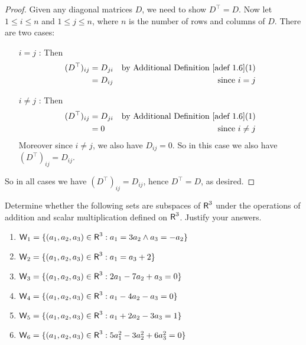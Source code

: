 \begin{proof}
Given any diagonal matrices \(D\), we need to show \(D^\top = D\).
Now let \(1 \le i \le n\) and \(1 \le j \le n\), where \(n\) is the number of rows and columns of \(D\).
There are two cases:
\begin{itemize}
    \item[\(i = j\)]: Then
        \begin{align*}
            (D^\top)_{ij} & = D_{ji} & \text{by \ADEF{1.6}(1)} \\
                       & = D_{ij} & \text{since \(i = j\)}
        \end{align*}
    \item[\(i \ne j\)]: Then
        \begin{align*}
            (D^\top)_{ij} & = D_{ji} & \text{by \ADEF{1.6}(1)} \\
                       & = 0 & \text{since \(i \ne j\)}
        \end{align*}
        Moreover since \(i \ne j\), we also have \(D_{ij} = 0\).
        So in this case we also have \((D^\top)_{ij} = D_{ij}\).
\end{itemize}
So in all cases we have \((D^\top)_{ij} = D_{ij}\), hence \(D^\top = D\), as desired.
\end{proof}

\begin{exercise} \label{exercise 1.3.8}
Determine whether the following sets are subspaces of \(\textsf{R}^3\) under the operations of addition and scalar multiplication defined on \(\textsf{R}^3\).
Justify your answers.
\begin{enumerate}
    \item \(\textsf{W}_1 = \{(a_1, a_2, a_3) \in \textsf{R}^3 : a_1 = 3 a_2 \land a_3 = -a_2\}\)
    \item \(\textsf{W}_2 = \{(a_1, a_2, a_3) \in \textsf{R}^3: a_1 = a_3 + 2\}\)
    \item \(\textsf{W}_3 = \{(a_1, a_2, a_3) \in \textsf{R}^3 : 2a_1 - 7a_2 + a_3 = 0\}\)
    \item \(\textsf{W}_4 = \{(a_1, a_2, a_3) \in \textsf{R}^3 : a_1 - 4a_2 - a_3 = 0\}\)
    \item \(\textsf{W}_5 = \{(a_1, a_2, a_3) \in \textsf{R}^3 : a_1 + 2a_2 - 3a_3 = 1\}\)
    \item \(\textsf{W}_6 = \{(a_1, a_2, a_3) \in \textsf{R}^3 : 5a_1^2 - 3a_2^2 + 6a_3^2 = 0\}\)
\end{enumerate}
\end{exercise}

